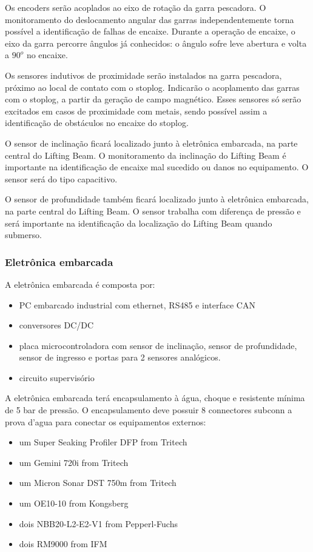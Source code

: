 Os encoders serão acoplados ao eixo de rotação da garra pescadora. O
monitoramento do deslocamento angular das garras independentemente torna
possível a identificação de falhas de encaixe. Durante a operação de encaixe, o
eixo da garra percorre ângulos já conhecidos: o ângulo sofre leve abertura e
volta a $90^o$ no encaixe. 

Os sensores indutivos de proximidade serão instalados na garra pescadora,
próximo ao local de contato com o stoplog. Indicarão o acoplamento das garras
com o stoplog, a partir da geração de campo magnético. Esses sensores só serão
excitados em casos de proximidade com metais, sendo possível assim a
identificação de obstáculos no encaixe do stoplog. 

O sensor de inclinação ficará localizado junto à eletrônica embarcada, na parte
central do Lifting Beam. O monitoramento da inclinação do Lifting Beam é
importante na identificação de encaixe mal sucedido ou danos no equipamento. O
sensor será do tipo capacitivo.

O sensor de profundidade também ficará localizado junto à eletrônica embarcada,
na parte central do Lifting Beam. O sensor trabalha com diferença de pressão e
será importante na identificação da localização do Lifting Beam quando submerso.

\subsubsection{Eletrônica embarcada}
A eletrônica embarcada é composta por: 

\begin{itemize}
	\item PC embarcado industrial com ethernet, RS485 e interface CAN
	\item  conversores DC/DC
	\item  placa microcontroladora com sensor de inclinação, sensor de profundidade, sensor de ingresso 	 	e portas para 2 sensores analógicos. 
	\item circuito supervisório
\end{itemize}

A eletrônica embarcada terá encapsulamento à  água,
choque e resistente mínima de 5 bar de pressão. O encapsulamento deve possuir 8 connectores subconn a prova d'agua para conectar os equipamentos externos: 

\begin{itemize}
 	\item um Super Seaking Profiler DFP from Tritech
 	\item um Gemini 720i from Tritech
	\item um Micron Sonar DST 750m from Tritech
	\item um OE10-10 from Kongsberg
	\item dois NBB20-L2-E2-V1 from Pepperl-Fuchs
	\item dois RM9000 from IFM 
\end{itemize}



